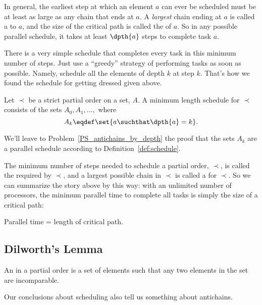 In general, the earliest step at which an element $a$ can ever be
scheduled must be at least as large as any chain that ends at $a$.  A
\emph{largest} chain ending at $a$ is called a  to
$a$, and the size of the critical path is called the  of
$a$.  So in any possible parallel schedule, it takes at least
$\dpth{a}$ steps to complete task $a$.

There is a very simple schedule that completes every task in this
minimum number of steps.  Just use a ``greedy'' strategy of performing
tasks as soon as possible.  Namely, schedule all the elements of depth
$k$ at step $k$.  That's how we found the schedule for getting dressed
given above.

\begin{theorem}\label{thm:parallel-time}
Let $\prec$ be a strict partial order on a set, $A$.  A minimum length
schedule for $\prec$ consists of the sets $A_0, A_1,\dots,$ where
\[
A_k \eqdef \set{a \suchthat \dpth{a} =k}.
\]
\end{theorem}

We'll leave to Problem~\ref{PS_antichains_by_depth} the proof that the
sets $A_k$ are a parallel schedule according to
Definition~\ref{def:schedule}.

The minimum number of steps needed to schedule a partial order,
$\prec$, is called the  required by $\prec$, and a
largest possible chain in $\prec$ is called a  for
$\prec$.  So we can summarize the story above by this way: with an
unlimited number of processors, the minimum parallel time to complete
all tasks is simply the size of a critical path:

\begin{corollary}\label{cor:critical-path-time}
Parallel time = length of critical path.
\end{corollary}

\subsection{Dilworth's Lemma}\label{dilworth_subsec}

\begin{definition}
An  in a partial order is a set of elements such that any
two elements in the set are incomparable.
\end{definition}

Our conclusions about scheduling also tell us something about antichains.

